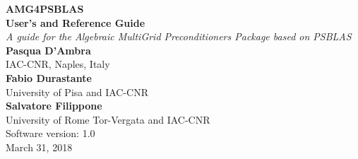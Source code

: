 \documentclass[a4paper,twoside,11pt]{article}
\begin{document}
{\LARGE\bfseries AMG4PSBLAS\\[.8ex] User's and Reference Guide}\\[\baselineskip]
\emph{\large A guide for the Algebraic MultiGrid Preconditioners Package based on PSBLAS}\\[3ex]
{\large\bfseries Pasqua D'Ambra}\\
\large IAC-CNR, Naples, Italy\\[3ex]
{\large\bfseries Fabio Durastante}\\
\large University of Pisa and IAC-CNR\\[3ex]
{\large\bfseries Salvatore Filippone} \\
\large University of Rome Tor-Vergata and IAC-CNR
\\[10ex]
Software version: 1.0\\
 March 31, 2018
\clearpage
\ \\
\thispagestyle{empty}
\clearpage

\setcounter{page}{1}    %


\cleardoublepage

\begingroup
  \renewcommand*{\thepage}{toc}
  \tableofcontents
\endgroup  
\cleardoublepage

\setcounter{page}{1}    %









\cleardoublepage
\appendix


\cleardoublepage

\end{document}
